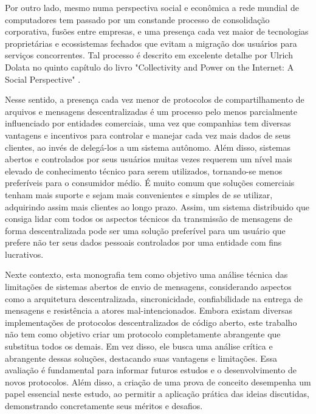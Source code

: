 Por outro lado, mesmo numa perspectiva social e econômica a rede mundial de computadores tem passado por um constande processo de consolidação corporativa, fusões entre empresas, e uma presença cada vez maior de tecnologias proprietárias e ecossistemas fechados que evitam a migração dos usuários para serviços concorrentes. Tal processo é descrito em excelente detalhe por Ulrich Dolata no quinto capítulo do livro "Collectivity and Power on the Internet: A Social Perspective" \cite{UlrichDolata}.

Nesse sentido, a presença cada vez menor de protocolos de compartilhamento de arquivos e mensagens descentralizadas é um processo pelo menos parcialmente influenciado por entidades comerciais, uma vez que companhias tem diversas vantagens e incentivos para controlar e manejar cada vez mais dados de seus clientes, ao invés de delegá-los a um sistema autônomo. Além disso, sistemas abertos e controlados por seus usuários muitas vezes requerem um nível mais elevado de conhecimento técnico para serem utilizados, tornando-se menos preferíveis para o consumidor médio. É muito comum que soluções comerciais tenham mais suporte e sejam mais convenientes e simples de se utilizar, adquirindo assim mais clientes ao longo prazo. Assim, um sistema distribuido que consiga lidar com todos os aspectos técnicos da transmissão de mensagens de forma descentralizada pode ser uma solução preferível para um usuário que prefere não ter seus dados pessoais controlados por uma entidade com fins lucrativos. 

Nexte contexto, esta monografia tem como objetivo uma análise técnica das limitações de sistemas abertos de envio de mensagens, considerando aspectos como a arquitetura descentralizada, sincronicidade, confiabilidade na entrega de mensagens e resistência a atores mal-intencionados. Embora existam diversas implementações de protocolos descentralizados de código aberto, este trabalho não tem como objetivo criar um protocolo completamente abrangente que substitua todos os demais. Em vez disso, ele busca uma análise crítica e abrangente dessas soluções, destacando suas vantagens e limitações. Essa avaliação é fundamental para informar futuros estudos e o desenvolvimento de novos protocolos. Além disso, a criação de uma prova de conceito desempenha um papel essencial neste estudo, ao permitir a aplicação prática das ideias discutidas, demonstrando concretamente seus méritos e desafios.
